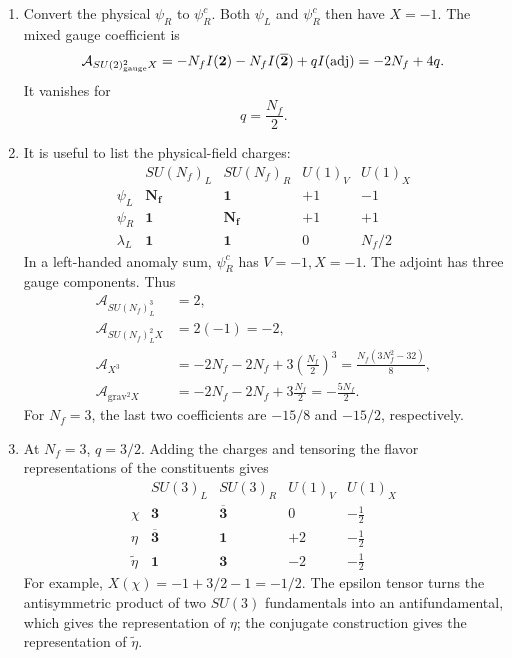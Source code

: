 \begin{enumerate}
\begin{enumerate}
    \item[(iv)]
    Convert the physical \(\psi_R\) to \(\psi_R^c\).  Both \(\psi_L\) and
    \(\psi_R^c\) then have \(X=-1\).  The mixed gauge coefficient is
    \[
      \mathcal A_{SU(2)_{\rm gauge}^2X}
       =-N_fI(\mathbf2)-N_fI(\overline{\mathbf2})
         +qI(\operatorname{adj})
       =-2N_f+4q.
    \]
    It vanishes for
    \[
      \boxed{q=\frac{N_f}{2}.}
    \]

    \item[(v)]
    It is useful to list the physical-field charges:
    \[
    \begin{array}{c|cccc}
       &SU(N_f)_L&SU(N_f)_R&U(1)_V&U(1)_X\\ \hline
      \psi_L&\mathbf{N_f}&\mathbf1&+1&-1\\
      \psi_R&\mathbf1&\mathbf{N_f}&+1&+1\\
      \lambda_L&\mathbf1&\mathbf1&0&N_f/2
    \end{array}
    \]
    In a left-handed anomaly sum, \(\psi_R^c\) has \(V=-1,X=-1\).
    The adjoint has three gauge components.  Thus
    \[
    \begin{aligned}
      \mathcal A_{SU(N_f)_L^3}&=2,\\
      \mathcal A_{SU(N_f)_L^2X}&=2(-1)=-2,\\
      \mathcal A_{X^3}
       &=-2N_f-2N_f
         +3\left(\frac{N_f}{2}\right)^3
        =\frac{N_f(3N_f^2-32)}8,\\
      \mathcal A_{\mathrm{grav}^2X}
       &=-2N_f-2N_f+3\frac{N_f}{2}
        =-\frac{5N_f}{2}.
    \end{aligned}
    \]
    For \(N_f=3\), the last two coefficients are
    \(-15/8\) and \(-15/2\), respectively.

    \item[(vi)]
    At \(N_f=3\), \(q=3/2\).  Adding the charges and tensoring the
    flavor representations of the constituents gives
    \[
    \begin{array}{c|cccc}
       &SU(3)_L&SU(3)_R&U(1)_V&U(1)_X\\ \hline
      \chi&\mathbf3&\overline{\mathbf3}&0&-\tfrac12\\
      \eta&\overline{\mathbf3}&\mathbf1&+2&-\tfrac12\\
      \widetilde\eta&\mathbf1&\mathbf3&-2&-\tfrac12
    \end{array}
    \]
    For example,
    \(X(\chi)=-1+3/2-1=-1/2\).  The epsilon tensor turns the
    antisymmetric product of two \(SU(3)\) fundamentals into an
    antifundamental, which gives the representation of \(\eta\);
    the conjugate construction gives the representation of
    \(\widetilde\eta\).


\end{enumerate}
\end{enumerate}
